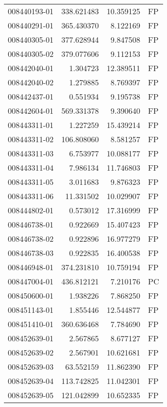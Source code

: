 \begin{tabular}{lrrl}
008440193-01 &  338.621483 &      10.359125 &   FP \\
008440291-01 &  365.430370 &       8.122169 &   FP \\
008440305-01 &  377.628944 &       9.847508 &   FP \\
008440305-02 &  379.077606 &       9.112153 &   FP \\
008442040-01 &    1.304723 &      12.389511 &   FP \\
008442040-02 &    1.279885 &       8.769397 &   FP \\
008442437-01 &    0.551934 &       9.195738 &   FP \\
008442604-01 &  569.331378 &       9.390640 &   FP \\
008443311-01 &    1.227259 &      15.439214 &   FP \\
008443311-02 &  106.808060 &       8.581257 &   FP \\
008443311-03 &    6.753977 &      10.088177 &   FP \\
008443311-04 &    7.986134 &      11.746803 &   FP \\
008443311-05 &    3.011683 &       9.876323 &   FP \\
008443311-06 &   11.331502 &      10.029907 &   FP \\
008444802-01 &    0.573012 &      17.316999 &   FP \\
008446738-01 &    0.922669 &      15.407423 &   FP \\
008446738-02 &    0.922896 &      16.977279 &   FP \\
008446738-03 &    0.922835 &      16.400538 &   FP \\
008446948-01 &  374.231810 &      10.759194 &   FP \\
008447004-01 &  436.812121 &       7.210176 &   PC \\
008450600-01 &    1.938226 &       7.868250 &   FP \\
008451143-01 &    1.855446 &      12.544877 &   FP \\
008451410-01 &  360.636468 &       7.784690 &   FP \\
008452639-01 &    2.567865 &       8.677127 &   FP \\
008452639-02 &    2.567901 &      10.621681 &   FP \\
008452639-03 &   63.552159 &      11.862390 &   FP \\
008452639-04 &  113.742825 &      11.042301 &   FP \\
008452639-05 &  121.042899 &      10.652335 &   FP \\

\end{tabular}
